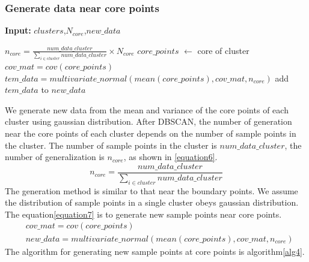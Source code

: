 \documentclass[runningheads]{llncs}
\begin{document}
\subsubsection{Generate data near core points}
\begin{algorithm}[htbp]
  \caption{$generate\_core$}
  \label{alg4}
  \hspace*{0.02in} {\bf Input:} $clusters$,$N_{core}$,$new\_data$
  \begin{algorithmic}
    \State $n_{core}=\frac{num\_data\_cluster}{\sum_{i \in cluster} num\_data\_cluster} \times N_{core}$
    \State $core\_points$ $\leftarrow$ core of cluster
    \State $cov\_mat=cov(core\_points)$
    \State $tem\_data=multivariate\_normal(mean(core\_points),cov\_mat,n_{core})$
    \State add $tem\_data$ to $new\_data$
  \EndFor
  \end{algorithmic}
\end{algorithm}
We generate new data from the mean and variance of the core points of each cluster using gaussian distribution.
After DBSCAN, 
the number of generation near the core points of each cluster depends 
on the number of sample points in the cluster.
The number of sample points in the cluster is $num\_data\_cluster$, 
 the number of generalization is $n_{core}$, as shown in \ref{equation6}.
 \begin{equation}
  \label{equation6}
  n_{core}=\frac{num\_data\_cluster}{\sum_{i \in cluster} num\_data\_cluster}
\end{equation}
The generation method is similar to that near the boundary points. 
We assume the distribution of sample points in a single cluster obeys gaussian distribution.
The equation\ref{equation7} is to generate new sample points near core points.
\begin{equation}
  \label{equation7}
  \begin{aligned}
    & cov\_mat=cov(core\_points) \\
    & new\_data=multivariate\_normal(mean(core\_points),cov\_mat,n_{core})
  \end{aligned}
\end{equation}
The algorithm for generating new sample points at core points is algorithm\ref{alg4}.
\end{document}
